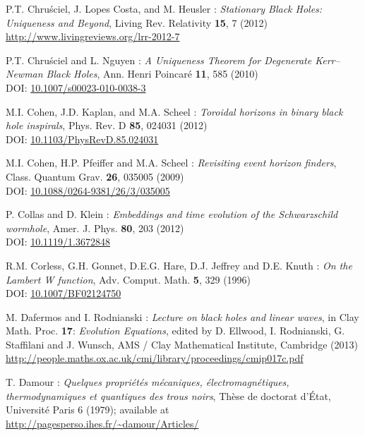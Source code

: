 \begin{thebibliography}{123}
P.T. Chru\'sciel, J. Lopes Costa, and M. Heusler :
{\em Stationary Black Holes: Uniqueness and Beyond},
Living Rev. Relativity {\bf 15}, 7 (2012) \\
\url{http://www.livingreviews.org/lrr-2012-7}

P.T. Chru\'sciel and L. Nguyen :
{\em A Uniqueness Theorem for Degenerate Kerr–Newman Black Holes},
Ann. Henri Poincar\'e {\bf 11}, 585 (2010)\\
DOI: \href{http://dx.doi.org/10.1007/s00023-010-0038-3}{10.1007/s00023-010-0038-3}

M.I. Cohen, J.D. Kaplan, and M.A. Scheel :
{\em Toroidal horizons in binary black hole inspirals},
Phys. Rev. D {\bf 85}, 024031 (2012)\\
DOI:  \href{http://dx.doi.org/10.1103/PhysRevD.85.024031}{10.1103/PhysRevD.85.024031}

M.I. Cohen, H.P. Pfeiffer and M.A. Scheel :
{\em Revisiting event horizon finders},
Class. Quantum Grav. {\bf 26}, 035005 (2009)\\
DOI: \href{http://dx.doi.org/10.1088/0264-9381/26/3/035005}{10.1088/0264-9381/26/3/035005}

P. Collas and D. Klein :
{\em Embeddings and time evolution of the Schwarzschild wormhole},
Amer. J. Phys. {\bf 80}, 203 (2012)\\
DOI: \href{http://dx.doi.org/10.1119/1.3672848}{10.1119/1.3672848}

R.M. Corless, G.H. Gonnet, D.E.G. Hare, D.J. Jeffrey and D.E. Knuth :
{\em On the Lambert W function},
Adv. Comput. Math. {\bf 5}, 329 (1996)\\
DOI: \href{http://dx.doi.org/10.1007/BF02124750}{10.1007/BF02124750}

M. Dafermos and I. Rodnianski : {\em Lecture on black holes and linear waves},
in  Clay Math. Proc. {\bf 17}: {\em Evolution Equations}, edited by
D. Ellwood, I. Rodnianski, G. Staffilani and J. Wunsch, AMS / Clay Mathematical Institute,
Cambridge (2013) \\
\url{http://people.maths.ox.ac.uk/cmi/library/proceedings/cmip017c.pdf}

T. Damour : {\em Quelques propri\'et\'es m\'ecaniques, \'electromagn\'etiques,
thermo\-dy\-na\-mi\-ques et quantiques des trous noirs},
Th\`ese de doctorat d'\'Etat, Universit\'e Paris 6 (1979); available at\\
\url{http://pagesperso.ihes.fr/~damour/Articles/}


\end{thebibliography}

